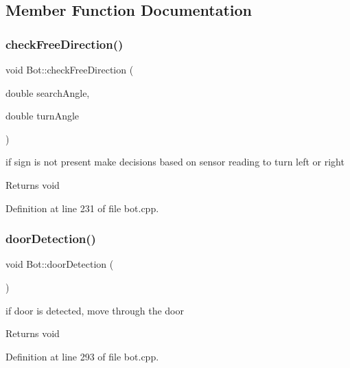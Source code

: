 \subsection{Member Function Documentation}
\mbox{\label{class_bot_a057a268f423e1d8aa71f01ff4bf23149}} 
\subsubsection{\texorpdfstring{check\+Free\+Direction()}{checkFreeDirection()}}
{\footnotesize\ttfamily void Bot\+::check\+Free\+Direction (\begin{DoxyParamCaption}\item[{double}]{search\+Angle,  }\item[{double}]{turn\+Angle }\end{DoxyParamCaption})}



if sign is not present make decisions based on sensor reading to turn left or right 

\begin{DoxyReturn}{Returns}
void 
\end{DoxyReturn}


Definition at line 231 of file bot.\+cpp.

\mbox{\label{class_bot_a308e7e40f00a853d1397cfafcb7d2cd5}} 
\subsubsection{\texorpdfstring{door\+Detection()}{doorDetection()}}
{\footnotesize\ttfamily void Bot\+::door\+Detection (\begin{DoxyParamCaption}{ }\end{DoxyParamCaption})}



if door is detected, move through the door 

\begin{DoxyReturn}{Returns}
void 
\end{DoxyReturn}


Definition at line 293 of file bot.\+cpp.

\mbox{\label{class_bot_a4a3b192232d8b938f11c1d253795c222}} 
